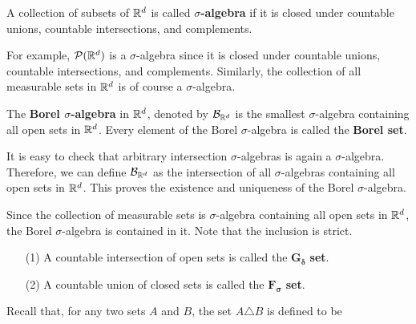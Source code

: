 \documentclass[12pt, a4paper, openany, twoside]{book}
\theoremstyle{definition}
\theoremstyle{remark}
\theoremstyle{plain}
\numberwithin{equation}{section}
\begin{document}
\vspace{5mm}
\begin{tcolorbox}[colback=yellow!10!white,colframe=blue!75!black,title=Definition 1.3.3]\label{Definition 1.3.3}
    A collection of subsets of ${\mathbb {R}}^d$ is called \textbf{$\sigma$-algebra} if it is closed under countable unions, countable intersections, and complements.
\end{tcolorbox}
\vspace{5mm}

For example, $\mathcal{P}({\mathbb {R}}^d)$ is a $\sigma$-algebra since it is closed under countable unions, countable intersections, and complements. Similarly, the collection of all measurable sets in ${\mathbb {R}}^d$ is of course a $\sigma$-algebra.
\vspace{5mm}
\begin{tcolorbox}[colback=yellow!10!white,colframe=blue!75!black,title=Definition 1.3.4]\label{Definition 1.3.4}
    The \textbf{Borel $\sigma$-algebra} in ${\mathbb {R}}^d$, denoted by $\mathcal{B}_{{\mathbb {R}}^d}$ is the smallest $\sigma$-algebra containing all open sets in ${\mathbb {R}}^d$. Every element of the Borel $\sigma$-algebra is called the \textbf{Borel set}.
\end{tcolorbox}

\vspace{5mm}
It is easy to check that arbitrary intersection $\sigma$-algebras is again a $\sigma$-algebra. Therefore, we can define $\mathcal{B}_{{\mathbb {R}}^d}$ as the intersection of all $\sigma$-algebras containing all open sets in ${\mathbb {R}}^d$. This proves the existence and uniqueness of the Borel $\sigma$-algebra.

Since the collection of measurable sets is $\sigma$-algebra containing all open sets in ${\mathbb {R}}^d$, the Borel $\sigma$-algebra is contained in it. Note that the inclusion is strict.

\vspace{5mm}
\begin{tcolorbox}[colback=yellow!10!white,colframe=blue!75!black,title=Definition 1.3.5]\label{Definition 1.3.5}
    \begin{enumerate}
        \item [(1)] A countable intersection of open sets is called the $\bm{G_\delta}$ \textbf{set}.
        \item [(2)] A countable union of closed sets is called the $\bm{F_\sigma}$ \textbf{set}.
    \end{enumerate}
\end{tcolorbox}
\vspace{5mm}
Recall that, for any two sets $A$ and $B$, the set $A\triangle B$ is defined to be 
\end{document}
